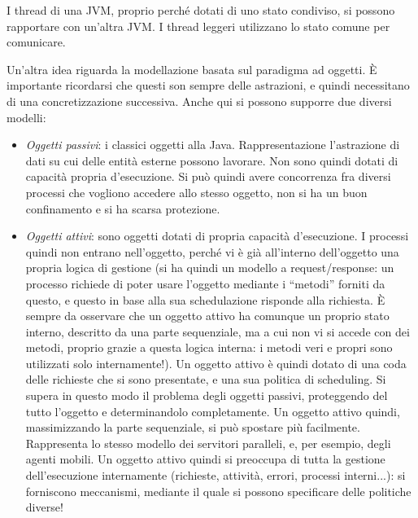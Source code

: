 I thread di una JVM, proprio perché dotati di uno stato condiviso, si possono rapportare con un'altra JVM. I thread
leggeri utilizzano lo stato comune per comunicare.

Un'altra idea riguarda la modellazione basata sul paradigma ad oggetti. È importante ricordarsi che questi son sempre
delle astrazioni, e quindi necessitano di una concretizzazione successiva. Anche qui si possono supporre due diversi
modelli:
\begin{itemize}
 \item \textit{Oggetti passivi}: i classici oggetti alla Java. Rappresentazione l'astrazione di dati su cui delle entità
esterne possono lavorare. Non sono quindi dotati di capacità propria d'esecuzione. Si può quindi avere concorrenza
fra diversi processi che vogliono accedere allo stesso oggetto, non si ha un buon confinamento e si ha scarsa
protezione.
  \item \textit{Oggetti attivi}: sono oggetti dotati di propria
capacità d'esecuzione. I processi quindi non entrano nell'oggetto, perché vi è
già all'interno dell'oggetto una propria logica di gestione (si ha quindi un
modello a request/response: un processo richiede di poter usare l'oggetto
mediante i ``metodi'' forniti da questo, e questo in base alla sua schedulazione
risponde alla richiesta. È sempre da osservare che un oggetto attivo ha comunque
un proprio stato interno, descritto da una parte sequenziale, ma a cui non vi si
accede con dei metodi, proprio grazie a questa logica interna: i metodi veri e
propri sono utilizzati solo internamente!). Un oggetto attivo è quindi dotato di
una coda delle richieste che si sono presentate, e una sua politica di
scheduling. Si supera in questo modo il problema degli oggetti passivi,
proteggendo del tutto l'oggetto e determinandolo completamente. Un oggetto
attivo quindi, massimizzando la parte sequenziale, si può spostare più
facilmente. Rappresenta lo stesso modello dei servitori paralleli, e, per
esempio, degli agenti mobili. Un oggetto attivo quindi si preoccupa di tutta la
gestione dell'esecuzione internamente (richieste, attività, errori, processi
interni...): si forniscono meccanismi, mediante il quale si possono specificare
delle politiche diverse!
\end{itemize}

